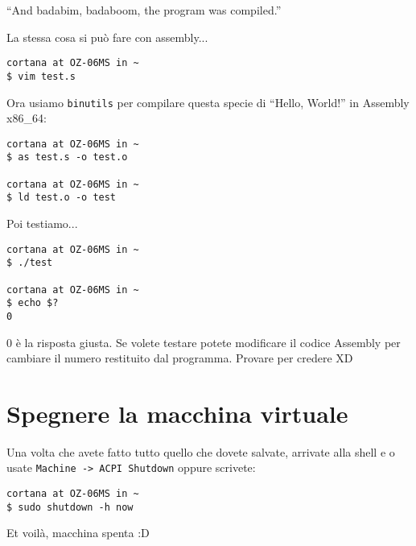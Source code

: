 \documentclass[a4paper]{memoir}
\begin{document}
		``And badabim, badaboom, the program was compiled.''
		
		La stessa cosa si può fare con assembly...
		
		\begin{Verbatim}[label={Holy Assembly, Batman!}]
cortana at OZ-06MS in ~
$ vim test.s
		\end{Verbatim}
		
		Ora usiamo \texttt{binutils} per compilare questa specie di ``Hello, World!'' in Assembly x86\_64:
		
		\begin{Verbatim}[label={Prima assembliamo, poi linkiamo...}]
cortana at OZ-06MS in ~
$ as test.s -o test.o

cortana at OZ-06MS in ~
$ ld test.o -o test
		\end{Verbatim}

		Poi testiamo...
		
		\begin{Verbatim}[label={Ma qualcuno li legge questi titoli?}]
cortana at OZ-06MS in ~
$ ./test

cortana at OZ-06MS in ~
$ echo $?
0
		\end{Verbatim}
		0 è la risposta giusta. Se volete testare potete modificare il codice Assembly per cambiare il numero
		restituito dal programma. Provare per credere XD
		
	\section*{Spegnere la macchina virtuale}
		
		Una volta che avete fatto tutto quello che dovete salvate, arrivate alla shell e o usate \texttt{Machine -> ACPI Shutdown}
		oppure scrivete:
		
		\begin{Verbatim}[label={Ma qualcuno li legge questi titoli?}]
cortana at OZ-06MS in ~
$ sudo shutdown -h now
		\end{Verbatim}

		Et voilà, macchina spenta :D
\end{document}
